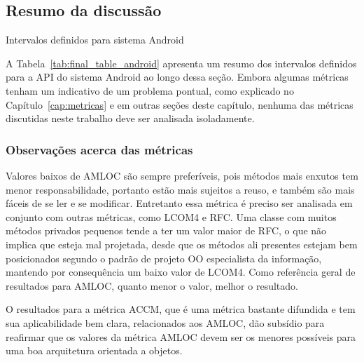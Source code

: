 \subsection{Resumo da discussão}

\begin{table}[!htb]
\begin{center}

\caption{Intervalos definidos para sistema Android}
\label{tab:final_table_android}
\end{center}
\end{table}

A Tabela~\ref{tab:final_table_android} apresenta um resumo dos intervalos definidos para a API do sistema Android ao longo dessa seção. Embora algumas métricas tenham um indicativo de um problema pontual, como explicado no Capítulo~\ref{cap:metricas} e em outras seções deste capítulo, nenhuma das métricas discutidas neste trabalho deve ser analisada isoladamente.

\subsubsection{Observações acerca das métricas}

Valores baixos de AMLOC são sempre preferíveis, pois métodos mais enxutos tem menor responsabilidade, portanto estão mais sujeitos a reuso, e também são mais fáceis de se ler e se modificar. Entretanto essa métrica é preciso ser analisada em conjunto com outras métricas, como LCOM4 e RFC. Uma classe com muitos métodos privados pequenos tende a ter um valor maior de RFC, o que não implica que esteja mal projetada, desde que os métodos ali presentes estejam bem posicionados segundo o padrão de projeto OO especialista da informação, mantendo por consequência um baixo valor de LCOM4. Como referência geral de resultados para AMLOC, quanto menor o valor, melhor o resultado.

O resultados para a métrica ACCM, que é uma métrica bastante difundida e tem sua aplicabilidade bem clara, relacionados aos AMLOC, dão subsídio para reafirmar que os valores da métrica AMLOC devem ser os menores possíveis para uma boa arquitetura orientada a objetos.

